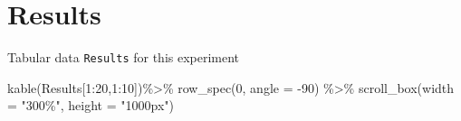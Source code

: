 \documentclass[
  letterpaper,
  DIV=11,
  numbers=noendperiod]{scrreprt}
\newenvironment{Shaded}{\begin{snugshade}}{\end{snugshade}}
\newcommand{\AttributeTok}[1]{\textcolor[rgb]{0.40,0.45,0.13}{#1}}
\newcommand{\DecValTok}[1]{\textcolor[rgb]{0.68,0.00,0.00}{#1}}
\newcommand{\FunctionTok}[1]{\textcolor[rgb]{0.28,0.35,0.67}{#1}}
\newcommand{\NormalTok}[1]{\textcolor[rgb]{0.00,0.23,0.31}{#1}}
\newcommand{\SpecialCharTok}[1]{\textcolor[rgb]{0.37,0.37,0.37}{#1}}
\newcommand{\StringTok}[1]{\textcolor[rgb]{0.13,0.47,0.30}{#1}}
\begin{document}
\hypertarget{results}{%
\section{Results}\label{results}}

Tabular data \texttt{Results} for this experiment

\begin{Shaded}
\begin{Highlighting}[]
\FunctionTok{kable}\NormalTok{(Results[}\DecValTok{1}\SpecialCharTok{:}\DecValTok{20}\NormalTok{,}\DecValTok{1}\SpecialCharTok{:}\DecValTok{10}\NormalTok{])}\SpecialCharTok{\%\textgreater{}\%}
  \FunctionTok{row\_spec}\NormalTok{(}\DecValTok{0}\NormalTok{, }\AttributeTok{angle =} \SpecialCharTok{{-}}\DecValTok{90}\NormalTok{) }\SpecialCharTok{\%\textgreater{}\%}   
  \FunctionTok{scroll\_box}\NormalTok{(}\AttributeTok{width =} \StringTok{"300\%"}\NormalTok{, }\AttributeTok{height =} \StringTok{"1000px"}\NormalTok{)}
\end{Highlighting}
\end{Shaded}
\end{document}
